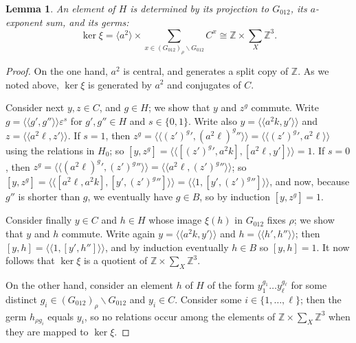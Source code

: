 \documentclass{amsart}
\newcommand\Z{\mathbb{Z}}
\newcommand\Grig{{G_{012}}}
\def\pair<#1>{{\langle\!\langle}#1{\rangle\!\rangle}}
\newtheorem{lemma}{Lemma}[section]
\theoremstyle{definition}
\begin{document}
\begin{lemma}\label{lem:kerxi}
  An element of $H$ is determined by its projection to $\Grig$, its
  $a$-exponent sum, and its germs:
  \[\ker\xi=\langle a^2\rangle\times\sum_{x\in
    (\Grig)_\rho\backslash\Grig}C^x\cong\Z\times\sum_X\Z^3.\]
\end{lemma}
\begin{proof}
  On the one hand, $a^2$ is central, and generates a split copy of
  $\Z$. As we noted above, $\ker\xi$ is generated by $a^2$ and
  conjugates of $C$.

  Consider next $y,z\in C$, and $g\in H$; we show that $y$ and $z^g$
  commute. Write $g=\pair<g',g''>\varepsilon^s$ for $g',g''\in H$ and
  $s\in\{0,1\}$. Write also $y=\pair<a^{2k},y'>$ and
  $z=\pair<a^{2\ell},z'>$.  If $s=1$, then
  $z^g=\pair<(z')^{g'},(a^{2\ell})^{g''}>=\pair<(z')^{g'},a^{2\ell}>$
  using the relations in $H_0$; so
  $[y,z^g]=\pair<[(z')^{g'},a^{2k}],[a^{2\ell},y']>=1$. If $s=0$, then
  $z^g=\pair<(a^{2\ell})^{g'},(z')^{g''}>=\pair<a^{2\ell},(z')^{g''}>$;
  so
  $[y,z^g]=\pair<[a^{2\ell},a^{2k}],[y',(z')^{g''}]>=\pair<1,[y',(z')^{g''}]>$,
  and now, because $g''$ is shorter than $g$, we eventually have $g\in
  B$, so by induction $[y,z^g]=1$.

  Consider finally $y\in C$ and $h\in H$ whose image $\xi(h)$ in
  $\Grig$ fixes $\rho$; we show that $y$ and $h$ commute. Write again
  $y=\pair<a^{2k},y'>$ and $h=\pair<h',h''>$; then
  $[y,h]=\pair<1,[y',h'']>$, and by induction eventually $h\in B$ so
  $[y,h]=1$. It now follows that $\ker\xi$ is a quotient of
  $\Z\times\sum_X\Z^3$.

  On the other hand, consider an element $h$ of $H$ of the form
  $y_1^{g_1}\dots y_\ell^{g_\ell}$ for some distinct $g_i\in
  (\Grig)_\rho\backslash\Grig$ and $y_i\in C$. Consider some
  $i\in\{1,\dots,\ell\}$; then the germ $h_{\rho g_i}$ equals $y_i$,
  so no relations occur among the elements of $\Z\times\sum_X\Z^3$
  when they are mapped to $\ker\xi$.
\end{proof}
\end{document}
